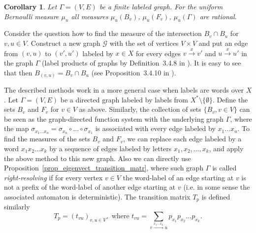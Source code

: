 \documentclass[12pt]{article}
\newcommand{\gr}{\Gamma}
\newcommand{\F}{\mathscr{F}}
\newtheorem{cor}[theor]{Corollary}
\theoremstyle{definition}
\begin{document}
\begin{cor}\label{cor_meas_gr_rational}
Let $\gr=(V,E)$ be a finite labeled graph. For the uniform Bernoulli measure $\mu_u$ all measures
$\mu_u(B_v)$, $\mu_u(F_v)$, $\mu_u(\gr)$ are rational.
\end{cor}


Consider the question how to find the measure of the intersection $B_v\cap B_u$ for $v,u\in V$.
Construct a new graph $\mathscr{G}$ with the set of vertices $V\times V$ and put an edge from
$(v,u)$ to $(v',u')$ labeled by $x\in X$ for every edges $v\stackrel{x}\rightarrow v'$ and
$u\stackrel{x}\rightarrow u'$ in the graph $\gr$ (label products of graphs by Definition~3.4.8 in
\cite{IntroSymbDyn}). It is easy to see that then $B_{(v,u)}=B_v\cap B_u$ (see Proposition~3.4.10
in \cite{IntroSymbDyn}).


The described methods work in a more general case when labels are words over $X$. Let $\gr=(V,E)$
be a directed graph labeled by labels from $X^{*}\setminus\{\emptyset\}$. Define the sets $B_v$ and
$F_v$ for $v\in V$ as above. Similarly, the collection of sets $\{B_v, v\in V\}$ can be seen as the
graph-directed function system with the underlying graph $\gr$, where the map $\sigma_{x_1\ldots
x_n}=\sigma_{x_n}\circ\ldots\circ\sigma_{x_1}$ is associated with every edge labeled by $x_1\ldots
x_n$. To find the measures of the sets $B_v$ and $F_v$, we can replace each edge labeled by a word
$x_1x_2\ldots x_k$ by a sequence of edges labeled by letters $x_1,x_2,\ldots,x_k$, and apply the
above method to this new graph. Also we can directly use
Proposition~\ref{prop_eigenvect_transition_matr}, where such graph $\gr$ is called
\textit{right-resolving} if for every vertex $v\in V$ the word-label of an edge starting at $v$ is
not a prefix of the word-label of another edge starting at $v$ (i.e. in some sense the associated
automaton is deterministic). The transition matrix $T_p$ is defined similarly
\[
T_p=(t_{vu})_{v,u\in V}, \mbox{ where } t_{vu}=\sum\limits_{v\xrightarrow{x_1...x_k}
u}p_{x_1}p_{x_2}\ldots p_{x_k}.
\]
\end{document}
